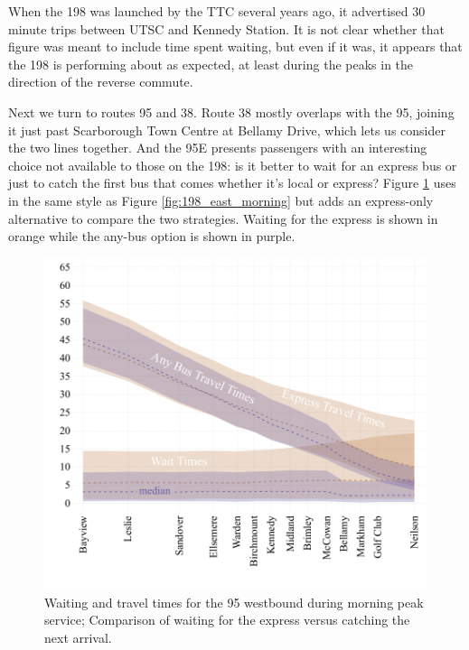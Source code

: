 \documentclass{article}
\begin{document}
		When the 198 was launched by the TTC several years ago, it advertised 30 minute trips between UTSC and Kennedy Station. It is not clear whether that figure was meant to include time spent waiting, but even if it was, it appears that the 198 is performing about as expected, at least during the peaks in the direction of the reverse commute.
		
		
		Next we turn to routes 95 and 38. Route 38 mostly overlaps with the 95, joining it just past Scarborough Town Centre at Bellamy Drive, which lets us consider the two lines together. And the 95E presents passengers with an interesting choice not available to those on the 198: is it better to wait for an express bus or just to catch the first bus that comes whether it's local or express? 
		Figure \ref{fig:95_east_morn} uses in the same style as Figure \ref{fig:198_east_morning} but adds an express-only alternative to compare the two strategies. Waiting for the express is shown in orange while the any-bus option is shown in purple. 
		
		\begin{figure}[h]
			\centering
			\includegraphics{figures/95_east_morning}
			\caption{ Waiting and travel times for the 95 westbound during morning peak service; Comparison of waiting for the express versus catching the next arrival.}
			\label{fig:95_east_morn}
		\end{figure}
		
\end{document}
